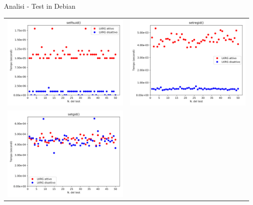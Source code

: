 \documentclass[12pt]{beamer}
\begin{document}
  \begin{frame}[fragile]{Analisi - Test in Debian}
  	\begin{tabular}{ c c }
    	\includegraphics[scale=0.11]{res/Debian/Setfsuid} & 
    	\includegraphics[scale=0.11]{res/Debian/Setregid}\\
    	\includegraphics[scale=0.11]{res/Debian/Setgid} & 

\end{tabular}
\end{frame}
\end{document}
